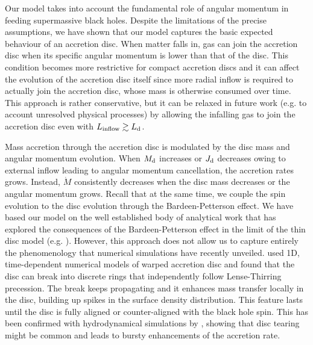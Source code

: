 \documentclass[a4paper,fleqn,usenatbib]{mnras}
\begin{document}
Our model takes into account the fundamental role of angular momentum in feeding supermassive black holes.
Despite the limitations of the precise assumptions, we have shown that our model captures the basic expected behaviour of an accretion disc.
When matter falls in, gas can join the accretion disc when its specific angular momentum is lower than that of the disc.
This condition becomes more restrictive for compact accretion discs and it can affect the evolution of the accretion disc itself since more radial inflow is required to actually join the accretion disc, whose mass is otherwise consumed over time.
This approach is rather conservative, but it can be relaxed in future work (e.g. to account unresolved physical processes) by allowing the infalling gas to join the accretion disc even with $L_{\rm inflow} \gtrsim L_{\rm d}$.

Mass accretion through the accretion disc is modulated by the disc mass and angular momentum evolution. 
When $M_{\rm d}$ increases or $J_{\rm d}$ decreases owing to external inflow leading to angular momentum cancellation, the accretion rates grows.
Instead, $\dot{M}$ consistently decreases when the disc mass decreases or the angular momentum grows.
Recall that at the same time, we couple the spin evolution to the disc evolution through the Bardeen-Petterson effect.
We have based our model on the well established body of analytical work that has explored the consequences of the Bardeen-Petterson effect in the limit of the thin disc model (e.g. \citealt{king+05, lodato+06, martin+07, perego+09}).
However, this approach does not allow us to capture entirely the phenomenology that numerical simulations have recently unveiled. \citet{nixon+12a} used 1D, time-dependent numerical models of warped accretion disc and found that the disc can break into discrete rings that independently follow Lense-Thirring precession.
The break keeps propagating and it enhances mass transfer locally in the disc, building up spikes in the surface density distribution.
This feature lasts until the disc is fully aligned or counter-aligned with the black hole spin.
This has been confirmed with hydrodynamical simulations by \citet{nixon+12b}, showing that disc tearing might be common and leads to bursty enhancements of the accretion rate.
\end{document}
